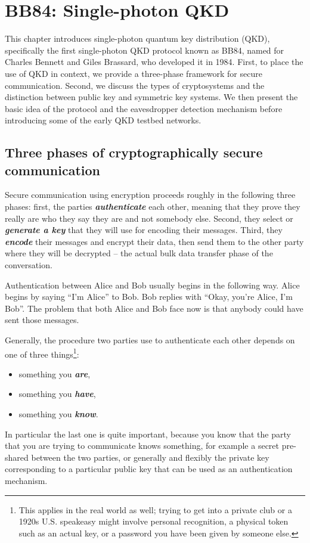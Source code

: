 \chapter{BB84: Single-photon QKD}
\label{sec:9_bb84}

This chapter introduces single-photon quantum key distribution (QKD), specifically the first single-photon QKD protocol known as BB84, named for Charles Bennett and Giles Brassard, who developed it in 1984. First, to place the use of QKD in context, we provide a three-phase framework for secure communication. Second, we discuss the types of cryptosystems and the distinction between public key and symmetric key systems. We then present the basic idea of the protocol and the eavesdropper detection mechanism before introducing some of the early QKD testbed networks.



\section{Three phases of cryptographically secure communication}
\label{sec:crypto-phases}

Secure communication using encryption proceeds roughly in the following three phases: first, the parties \textbf{\emph{authenticate}} each other, meaning that they prove they really are who they say they are and not somebody else.
Second, they select or \textbf{\emph{generate a key}} that they will use for encoding their messages. 
Third, they \textbf{\emph{encode}} their messages and encrypt their data, then send them to the other party where they will be decrypted -- the actual bulk data transfer phase of the conversation.

Authentication between Alice and Bob usually begins in the following way.
Alice begins by saying ``I'm Alice'' to Bob.
Bob replies with ``Okay, you're Alice, I'm Bob''.
The problem that both Alice and Bob face now is that anybody could have sent those messages.

Generally, the procedure two parties use to authenticate each other depends on one of three things\footnote{This applies in the real world as well; trying to get into a private club or a 1920s U.S. speakeasy might involve personal recognition, a physical token such as an actual key, or a password you have been given by someone else.}:
\begin{itemize}
    \item something you \textbf{\emph{are}},
    \item something you \textbf{\emph{have}},
    \item something you \textbf{\emph{know}}.
\end{itemize}
In particular the last one is quite important, because you know that the party that you are trying to communicate knows something, for example a secret pre-shared between the two parties, or generally and flexibly the private key corresponding to a particular public key that can be used as an authentication mechanism.

